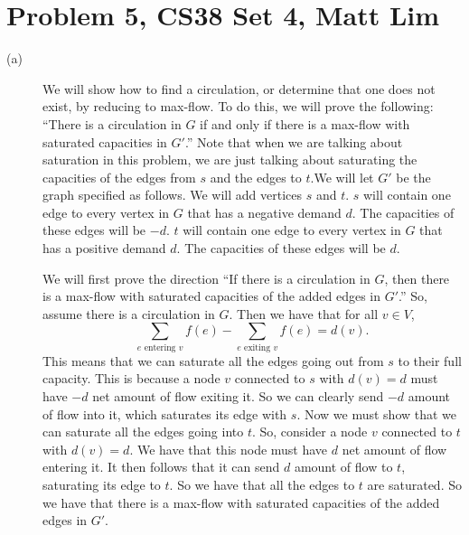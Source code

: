 \documentclass{article}
\begin{document}
\section*{Problem 5, CS38 Set 4, Matt Lim}
\begin{description}
    \item[(a)] We will show how to find a circulation, or determine that one
        does not exist, by reducing to max-flow. To do this, we will prove the
        following: ``There is a circulation in $G$ if and only if there is a
        max-flow with saturated capacities in $G'$.'' Note that when we are
        talking about saturation in this
        problem, we are just talking about saturating the capacities of the
        edges from $s$ and the edges to $t$.We will let $G'$ be the
        graph specified as follows. We will add vertices $s$ and $t$. $s$ will
        contain one edge to every vertex in $G$ that has a negative demand $d$.
        The capacities of these edges will be $-d$. $t$ will contain one edge to
        every vertex in $G$ that has a positive demand $d$. The capacities of
        these edges will be $d$.

        We will first prove the direction ``If there is a circulation in $G$,
        then there is a max-flow with saturated capacities of the added edges
        in $G'$.'' So, assume
        there is a circulation in $G$. Then we have that for all $v \in V$,
        \[\sum_{e \mbox{ entering } v}f(e) - \sum_{e \mbox{ exiting } v}f(e) = d(v).\]
        This means that we can saturate all the edges going out from $s$ to
        their full capacity. This is because a node $v$ connected to $s$ with $d(v)
        = d$
        must have $-d$ net amount of flow exiting it. So we can clearly send $-d$
        amount of flow into it, which saturates its edge with $s$. Now we
        must show that we can saturate all the edges going into $t$. So,
        consider a node $v$ connected to $t$ with $d(v) = d$. We have that this node
        must have $d$ net amount of flow entering it. It then follows that it can
        send $d$ amount of flow to $t$, saturating its edge to $t$. So we have
        that all the edges to $t$ are saturated. So we have that there is a
        max-flow with saturated capacities of the added edges in $G'$.


\end{description}
\end{document}
